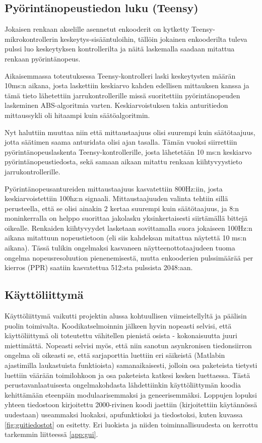 \documentclass{article}
\begin{document}
\subsection{Pyörintänopeustiedon luku (Teensy)}
Jokaisen renkaan akselille asennetut enkooderit on kytketty Teensy-mikrokontrollerin keskeytys-sisääntuloihin, tällöin jokainen enkooderilta tuleva pulssi luo keskeytyksen kontrollerilta ja näitä laskemalla saadaan mitattua renkaan pyörintänopeus.

Aikaisemmassa toteutuksessa Teensy-kontrolleri laski keskeytysten määrän 10ms:n aikana, josta laskettiin keskiarvo kahden edellisen mittauksen kanssa ja tämä tieto lähetettiin jarrukontrollerille missä suoritettiin pyörintänopeuden laskeminen ABS-algoritmia varten. Keskiarvoistuksen takia anturitiedon mittaussykli oli hitaampi kuin säätöalgoritmin.

Nyt haluttiin muuttaa niin että mittaustaajuus olisi suurempi kuin säätötaajuus, jotta säätimen saama anturidata olisi ajan tasalla. Tämän vuoksi siirrettiin pyörintänopeuslaskenta Teensy-kontrollerille, josta lähetetään 10 ms:n keskiarvo pyörintänopeustiedosta, sekä samaan aikaan mitattu renkaan kiihtyvyystieto jarrukontrollerille.

Pyörintänopeusantureiden mittaustaajuus kasvatettiin 800Hz:iin, josta keskiarvoistettiin 100hz:n signaali. Mittaustaajuuden valinta tehtiin sillä perusteella, että se olisi ainakin 2 kertaa suurempi kuin säätötaajuus, ja 8:n moninkerralla on helppo suorittaa jakolasku yksinkertaisesti siirtämällä bittejä oikealle. Renkaiden kiihtyvyydet lasketaan sovittamalla suora jokaiseen 100Hz:n aikana mitattuun nopeustietoon (eli siis kahdeksan mitattua näytettä 10 ms:n aikana). Tässä tulikin ongelmaksi kasvaneen näytteenottotaajudeen tuoma ongelma nopeusresoluution pienenemisestä, mutta enkooderien pulssimäärää per kierros (PPR) saatiin kasvatettua 512:sta pulssista 2048:aan.


\subsection{Käyttöliittymä}
Käyttöliittymä vaikutti projektin alussa kohtuullisen viimeistellyltä ja päälisin puolin toimivalta. Koodikatselmoinnin jälkeen hyvin nopeasti selvisi, että käyttöliittymä oli toteutettu vähitellen pienistä osista - kokonaisuutta juuri miettimättä. Nopeasti selvisi myös, että niin sanotun asynkronisen tiedonsiirron ongelma oli oikeasti se, että sarjaporttia luettiin eri säikeistä (Matlabin ajastimilla laukastuista funktioista) samanaikaisesti, jolloin osa paketeista tietysti luettiin väärään toimilohkoon ja osa paketeista katkesi kesken luettaessa. Tästä perustavanlaatuisesta ongelmakohdasta lähdettiinkin käyttöliittymän koodia kehittämään eteenpäin modulaarisemmaksi ja geneerisemmäksi. Loppujen lopuksi yhteen tiedostoon kirjoitettu 2000-rivinen koodi jaettiin (kirjoitettiin käytännössä uudestaan) useammaksi luokaksi, apufunktioksi ja tiedostoksi, kuten kuvassa \ref{fig:guitiedostot} on esitetty. Eri luokista ja niiden toiminnallisuudesta on kerrottu tarkemmin liitteessä \ref{app:gui}.
\end{document}
